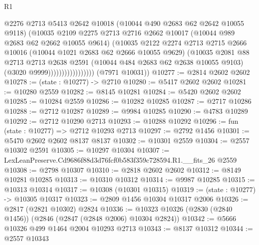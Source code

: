 \begin{lexlean}{R1}
\begin{coremodule}
                                @2276
                                @2713
                                @5413
                                @2642
                                @10018
                                (@10044 @490 @2683 @62 @2642 @10055 @9118)
                                (@10035
                                  @2109
                                  @2275
                                  @2713
                                  @2716
                                  @2662
                                  @10017
                                  (@10044 @989 @2683 @62 @2662 @10055 @9614)
                                  (@10035
                                    @2122
                                    @2274
                                    @2713
                                    @2715
                                    @2666
                                    @10016
                                    (@10044 @1021 @2683 @62 @2666 @10055 @9629)
                                    (@10035
                                      @2081
                                      @88
                                      @2713
                                      @2713
                                      @2638
                                      @2591
                                      (@10044 @484 @2683 @62 @2638 @10055 @9103)
                                      (@3020 @9999)))))))))))))))))
      (@7971 @10031))
@10277 := @2814 @2602 @2602
@10278 := (state : @10277) -> @2710
@10280 := @5417 @2602 @2602
@10281 := @10280 @2559
@10282 := @8145 @10281
@10284 := @5420 @2602 @2602
@10285 := @10284 @2559
@10286 := @10282 @10285
@10287 := @2717 @10286
@10288 := @2712 @10287
@10289 := @9984 @10285
@10290 := @4783 @10289
@10292 := @2712 @10290 @2713
@10293 := @10288 @10292
@10296 := fun (state : @10277) => @2712 @10293 @2713
@10297 := @2792 @1456
@10301 := @5470 @2602 @2602 @8137 @8137
@10302 := @10301 @2559
@10304 := @2557 @10302 @2591
@10305 := @10297 @10304
@10307 := LexLeanPreserve.Cd9686f88d3d76fcf0b583f359c728594.R1.__fits_26 @2559
@10308 := @2798 @10307
@10310 := @2818 @2602 @2602
@10312 := @8149 @10281 @10285
@10313 := @10310 @10312
@10314 := @9987 @10285
@10315 := @10313 @10314
@10317 := @10308 (@10301 @10315)
@10319 := (state : @10277) -> @10305 @10317
@10323 := @2809 @1456 @10304 @10317 @2006
@10326 := @2817 (@2821 @10302) @2824
@10336 := @10323 @10326 (@2830 (@2840 @1456)) (@2846 (@2847 (@2848 @2006) @10304 @2824))
@10342 := @5666 @10326 @499 @1464 @2004 @10293 @2713
@10343 := @8137 @10312
@10344 := @2557 @10343

\end{coremodule}
\end{lexlean}
